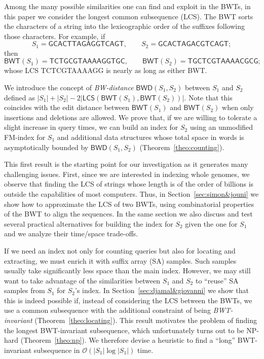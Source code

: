 \documentclass{llncs}
\newcommand{\Oh}[1]
  {\ensuremath{\mathcal{O}\!\left( {#1} \right)}}
\newcommand{\LCS}
  {\ensuremath{\mathsf{LCS}}}
\newcommand{\BWD}
  {\ensuremath{\mathsf{BWD}}}
\newcommand{\BWT}
  {\ensuremath{\mathsf{BWT}}}
\begin{document}
Among the many possible similarities one can find and exploit in the BWTs, in
this paper we consider the longest common subsequence (LCS). The BWT sorts
the characters of a string into the lexicographic order of the suffixes
following those characters.  For example, if
$$
S_1 = \mathsf{GCACTTAGAGGTCAGT},\qquad
S_2 = \mathsf{GCACTAGACGTCAGT};
$$
then
$$
\BWT (S_1) = \mathsf{TCTGCGTAAAAGGTGC},\qquad
\BWT (S_2) = \mathsf{TGCTCGTAAAACGCG};
$$
whose LCS {\sf TCTCGTAAAAGG} is nearly as long as either BWT.

\pagebreak

We introduce the concept of {\em BW-distance} \(\BWD (S_1, S_2)\) between
$S_1$ and $S_2$ defined as $|S_1| + |S_2| - 2 |\LCS(\BWT (S_1),\BWT (S_2))|$.
Note that this coincides with the edit distance between $\BWT (S_1)$ and
$\BWT (S_2)$ when only insertions and deletions are allowed. We prove that,
if we are willing to tolerate a slight increase in query times, we can build
an index for $S_2$ using an unmodified FM-index for $S_1$ and additional data
structures whose total space in words is asymptotically bounded by $\BWD
(S_1, S_2)$ (Theorem~\ref{theo:counting}).

This first result is the starting point for our investigation as it generates
many challenging issues. First, since we are interested in indexing whole
genomes, we observe that finding the LCS of strings
whose length is of the order of billions is outside the capabilities of most
computers. Thus, in Section~\ref{sec:simon&jouni} we show how to approximate
the LCS of two BWTs, using combinatorial properties of
the BWT to align the sequences. In the same section we also discuss and test
several practical alternatives for building the index for $S_2$ given the one
for $S_1$ and we analyze their time/space trade-offs.

If we need an index not only for counting queries but also for locating and
extracting, we must enrich it with suffix array (SA) samples. Such samples
usually take significantly less space than the main index. However, we may
still want to take advantage of the similarities between $S_1$ and $S_2$ to
``reuse'' SA samples from $S_1$ for $S_2$'s index. In
Section~\ref{sec:djamal&giovanni} we show that this is indeed possible if,
instead of considering the LCS between the BWTs, we use a common subsequence
with the additional constraint of being {\em BWT-invariant}
(Theorem~\ref{theo:locating}). This result motivates the problem of finding
the longest BWT-invariant subsequence, which unfortunately turns out to be
NP-hard (Theorem~\ref{theo:np}). We therefore devise a heuristic to find a
``long'' BWT-invariant subsequence in $\Oh{|S_1|\log|S_1|}$ time.
\end{document}
